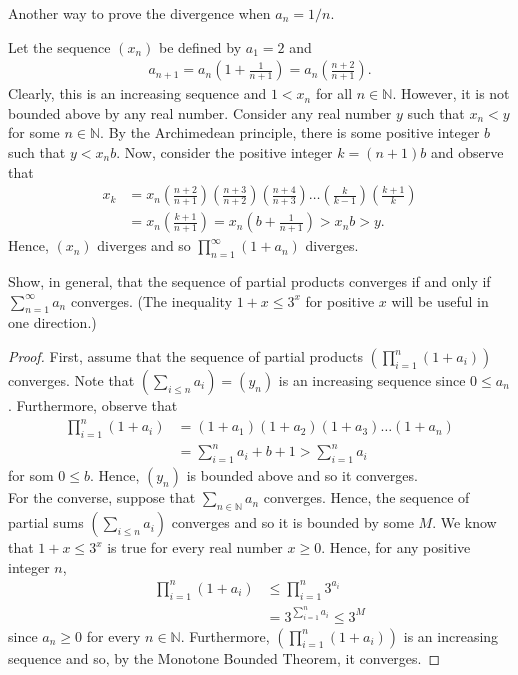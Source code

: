 \documentclass[12pt]{article}
\newcommand{\N}{\mathbb{N}}
\newenvironment{problem}[2][Problem]{\begin{trivlist} \item[\hskip \labelsep {\bfseries #1}\hskip \labelsep {\bfseries #2.}]}{\end{trivlist}}
\newenvironment{solution}[1][Solution]{\begin{trivlist} \item[\hskip \labelsep {\bfseries #1}]}{\end{trivlist}}
\begin{document}
\begin{problem}{2.4.10 (Infinite Products)}
\begin{enumerate}
\begin{solution}
Another way to prove the divergence  when $a_{n} = 1/n$. 

Let the sequence $(x_{n})$ be defined by $a_{1} = 2$ and
\begin{align*}
  a_{n+1} = a_{n}\left( 1+\frac{1}{n+1} \right) = a_{n}\left( \frac{n+2}{n+1} \right).
\end{align*}
Clearly, this is an increasing sequence and $1<x_{n}$ for all $n\in \N$. However, it is not bounded above by any real number. Consider any real number $y$ such that $x_{n} <y$ for some $n\in \N$. By the Archimedean principle, there is some positive integer $b$ such that $y<x_{n}b$. Now, consider the positive integer $k=(n+1)b$ and observe that
\begin{align*}
  x_{k} &= x_{n}\left( \frac{n+2}{n+1} \right)\left( \frac{n+3}{n+2} \right)\left( \frac{n+4}{n+3} \right)\dots\left( \frac{k}{k-1} \right)\left( \frac{k+1}{k} \right)\\
  &= x_{n}\left( \frac{k+1}{n+1} \right) = x_{n}\left( b+\frac{1}{n+1} \right) > x_{n} b > y. 
\end{align*}
Hence, $(x_{n})$ diverges and so $\prod_{n=1}^{\infty}(1+a_{n})$ diverges.
\end{solution}
  \item Show, in general, that the sequence of partial products converges if and only if $\sum_{n=1}^{\infty}a_{n}$ converges. (The inequality $1+x\leq 3^{x}$ for positive $x$ will be useful in one direction.)
\begin{proof}
  First, assume that the sequence of partial products $\left(\prod_{i=1}^{n} (1+a_{i})\right)$ converges. Note that $\left( \sum_{i\leq n} a_{i} \right)=(y_{n})$ is an increasing sequence since $0\leq a_{n}$. Furthermore, observe that 
\begin{align*}
  \prod_{i=1}^{n}(1+a_{i}) &= (1+a_{1})(1+a_{2})(1+a_{3})\dots(1+a_{n})\\
    &= \sum_{i=1}^{n}a_{i} + b +1 > \sum_{i=1}^{n}a_{i}
\end{align*}
for som $0\leq b$. Hence, $(y_{n})$ is bounded above and so it converges.\\

For the converse, suppose that $\sum_{n\in \N} a_{n}$ converges. Hence, the sequence of partial sums $\left( \sum_{i\leq n}a_{i} \right)$ converges and so it is bounded by some $M$. We know that $1+x\leq 3^{x}$ is true for every real number $x\geq 0$. Hence, for any positive integer $n$,
\begin{align*}
  \prod_{i=1}^{n}(1+a_{i}) &\leq \prod_{i=1}^{n} 3^{a_{i}}\\
  &= 3^{\sum_{i=1}^{n}a_{i}}\leq 3^{M}
\end{align*}
since $a_{n}\geq 0$ for every $n\in \N$. Furthermore, $\left( \prod_{i=1}^{n}(1+a_{i}) \right)$ is an increasing sequence and so, by the Monotone Bounded Theorem, it converges.
\end{proof}
\end{enumerate}
\end{problem}
\end{document}
